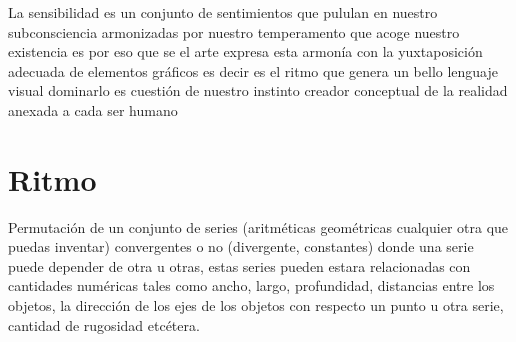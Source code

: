 \documentclass[a4paper]{book}
\begin{document}
La sensibilidad es un conjunto de sentimientos que pululan en nuestro subconsciencia armonizadas por nuestro temperamento que acoge nuestro existencia es por eso que se el arte expresa esta armonía con la yuxtaposición adecuada de elementos gráficos es decir es el ritmo que genera un bello lenguaje visual dominarlo es cuestión de nuestro instinto creador conceptual de la realidad anexada a cada ser humano


\section{Ritmo}


Permutación de un conjunto de series (aritméticas geométricas cualquier otra que puedas inventar) convergentes o no (divergente, constantes) donde una serie puede depender de otra u otras, estas series pueden estara relacionadas con cantidades numéricas tales como ancho, largo, profundidad, distancias entre los objetos, la dirección de los ejes de los objetos con respecto un punto u otra serie, cantidad de rugosidad etcétera.
\end{document}
